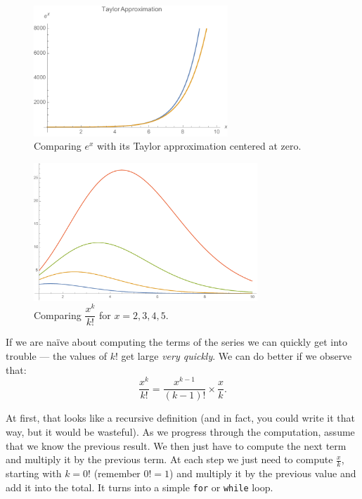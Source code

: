 \documentclass[11pt]{article}
\begin{document}
\begin{figure}[bth]
\begin{centering}
\includegraphics[width=0.65\textwidth]{Exp.pdf}
\caption{Comparing $e^x$ with its Taylor approximation centered at zero.}\label{exp}
\end{centering}
\end{figure}

\begin{figure}[bth]
\begin{centering}
\includegraphics[width=0.75\textwidth]{Growth}
\caption{Comparing $\dfrac{x^k}{k!}$ for $x=2,3,4,5$.}\label{growth}
\end{centering}
\end{figure}

If we are na\"ive about computing the terms of the series we can
quickly get into trouble --- the values of $k!$ get large \emph{very quickly}.
We can do better if we observe that:
$$
\frac{x^k}{k!} = \frac{x^{k-1}}{(k-1)!} \times \frac{x}{k} .
$$


At first, that looks like a recursive definition (and in fact, you
could write it that way, but it would be wasteful). As we progress
through the computation, assume that we know the previous result.
We then just have to compute the next term and multiply it by the
previous term.  At each step we just need to compute $\frac{x}{k}$,
starting with $k = 0!$ (remember $0! = 1$) and multiply it by the previous value and
add it into the total. It turns into a simple \texttt{for} or
\texttt{while} loop.
\end{document}
